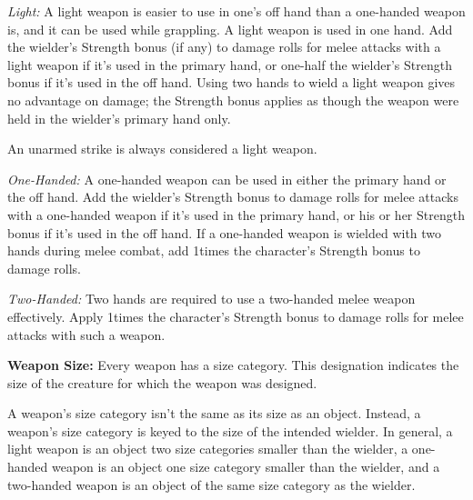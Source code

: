 \textit{Light:} A light weapon is easier to use in one's off hand than a one-handed weapon is, and it can be used while grappling. A light weapon is used in one hand. Add the wielder's Strength bonus (if any) to damage rolls for melee attacks with a light weapon if it's used in the primary hand, or one-half the wielder's Strength bonus if it's used in the off hand. Using two hands to wield a light weapon gives no advantage on damage; the Strength bonus applies as though the weapon were held in the wielder's primary hand only.

An unarmed strike is always considered a light weapon.

\textit{One-Handed:} A one-handed weapon can be used in either the primary hand or the off hand. Add the wielder's Strength bonus to damage rolls for melee attacks with a one-handed weapon if it's used in the primary hand, or \onehalf his or her Strength bonus if it's used in the off hand. If a one-handed weapon is wielded with two hands during melee combat, add 1\onehalf times the character's Strength bonus to damage rolls.

\textit{Two-Handed:} Two hands are required to use a two-handed melee weapon effectively. Apply 1\onehalf times the character's Strength bonus to damage rolls for melee attacks with such a weapon.

\textbf{Weapon Size:} Every weapon has a size category. This designation indicates the size of the creature for which the weapon was designed.


A weapon's size category isn't the same as its size as an object. Instead, a weapon's size category is keyed to the size of the intended wielder. In general, a light weapon is an object two size categories smaller than the wielder, a one-handed weapon is an object one size category smaller than the wielder, and a two-handed weapon is an object of the same size category as the wielder.

